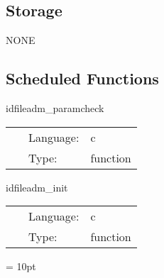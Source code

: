 \subsection*{Storage}NONE
\subsection*{Scheduled Functions}
\vspace{5mm}


\hspace{5mm} idfileadm\_paramcheck 

\hspace{5mm}{\it ensure that all admbase initial data are either initialised or read from a file } 


\hspace{5mm}

 \begin{tabular*}{160mm}{cll} 
~ & Language:  & c \\ 
~ & Type:  & function \\ 
\end{tabular*} 


\vspace{5mm}


\hspace{5mm} idfileadm\_init 

\hspace{5mm}{\it initialise the conformal\_state } 


\hspace{5mm}

 \begin{tabular*}{160mm}{cll} 
~ & Language:  & c \\ 
~ & Type:  & function \\ 
\end{tabular*} 



\vspace{5mm}\parskip = 10pt 

